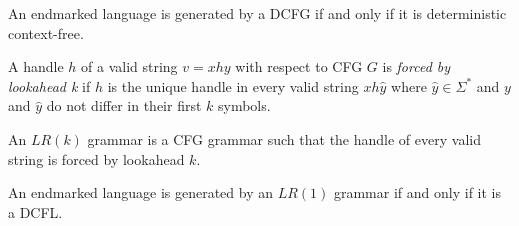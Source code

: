\documentclass{article}
\begin{document}
\begin{theorem}
    An endmarked language is generated by a DCFG if and only if it is deterministic context-free.
\end{theorem}

\begin{definition}
    A handle $h$ of a valid string $v=xhy$ with respect to CFG $G$ is \emph{forced by lookahead k} 
    if $h$ is the unique handle in every valid string $xh\hat y$ where $\hat y\in\Sigma^*$ and 
    $y$ and $\hat y$ do not differ in their first $k$ symbols.

    An $LR(k)$ grammar is a CFG grammar such that the handle of every valid string is forced by 
    lookahead $k$.
\end{definition}

\begin{theorem}[Sipser p. 154]
    An endmarked language is generated by an $LR(1)$ grammar if and only if it is a DCFL. 
\end{theorem}
\end{document}

